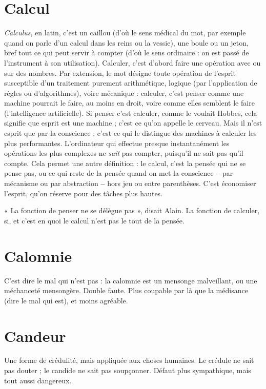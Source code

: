 \section{Calcul}
{\it Calculus}, en latin, c’est un caillou (d’où le sens médical du mot, par
exemple quand on parle d’un calcul dans les reins ou la vessie), une
boule ou un jeton, bref tout ce qui peut servir à compter (d’où le sens
ordinaire : on est passé de l'instrument à son utilisation). Calculer, c’est
d’abord faire une opération avec ou sur des nombres. Par extension, le mot
désigne toute opération de l'esprit susceptible d’un traitement purement arithmétique,
logique (par l'application de règles ou d’algorithmes), voire mécanique :
calculer, c’est penser comme une machine pourrait le faire, au moins en
droit, voire comme elles semblent le faire (l'intelligence artificielle). Si penser
c’est calculer, comme le voulait Hobbes, cela signifie que esprit est une
machine ; c’est ce qu’on appelle le cerveau. Mais il n’est esprit que par la
conscience ; c’est ce qui le distingue des machines à calculer les plus performantes.
L'ordinateur qui effectue presque instantanément les opérations les
plus complexes ne {\it sait} pas compter, puisqu'il ne sait pas qu’il compte. Cela
permet une autre définition : le calcul, c’est la pensée qui ne se pense pas, ou ce
qui reste de la pensée quand on met la conscience {\bf --} par mécanisme ou par abstraction {\bf --}
hors jeu ou entre parenthèses. C’est économiser l'esprit, qu’on
réserve pour des tâches plus hautes.

« La fonction de penser ne se délègue pas », disait Alain. La fonction de calculer,
si, et c’est en quoi le calcul n’est pas le tout de la pensée.

\section{Calomnie}
C'est dire le mal qui n’est pas : la calomnie est un mensonge
malveillant, ou une méchanceté mensongère. Double faute.
Plus coupable par là que la médisance (dire le mal qui est), et moins agréable.

\section{Candeur}
Une forme de crédulité, mais appliquée aux choses humaines. Le
crédule ne sait pas douter ; le candide ne sait pas soupçonner.
Défaut plus sympathique, mais tout aussi dangereux.

